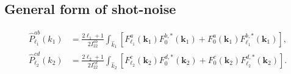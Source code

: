\documentclass[a4paper,11pt]{article}
\begin{document}







\subsection{General form of shot-noise}
\begin{align}
\hat P^{ab}_{\ell_1}(k_1)
&=
\frac{2\ell_1+1}{2I^{ab}_{22}}
\int_{\hat k_1}
\left[
F^a_{\ell_1}(\mathbf k_1)F^{b,*}_{0}(\mathbf k_1)
+
F^a_{0}(\mathbf k_1)F^{b,*}_{\ell_1}(\mathbf k_1)
\right],
\\
\hat P^{cd}_{\ell_2}(k_2)
&=
\frac{2\ell_2+1}{2I^{cd}_{22}}
\int_{\hat k_2}
\left[
F^c_{\ell_2}(\mathbf k_2)F^{d,*}_{0}(\mathbf k_2)
+
F^c_{0}(\mathbf k_2)F^{d,*}_{\ell_2}(\mathbf k_2)
\right].
\end{align}
\end{document}
